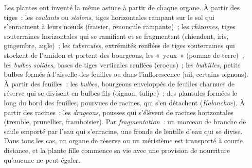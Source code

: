 \begin{proposition}\label{prop:b2:asexual-reproduction:organs}
Les plantes ont inventé la même astuce à partir de chaque organe. À
partir des tiges~: les \emph{coulants} ou \emph{stolons}, tiges
horizontales rampant sur le sol qui s'enracinent à leurs nœuds
(fraisier, renoncule rampante)~; les \emph{rhizomes}, tiges souterraines
horizontales qui se ramifient et se fragmentent (chiendent, iris,
gingembre,  aigle)~; les \emph{tubercules}, extrémités renflées de
tiges souterraines qui stockent de l'amidon et portent des bourgeons,
les «~yeux~» (pomme de terre)~; les \emph{bulbes solides}, bases de tiges
verticales renflées (crocus)~; les \emph{bulbilles}, petits bulbes
formés à l'aisselle des feuilles ou dans l'inflorescence (ail, certains
oignons). À partir des feuilles~: les \emph{bulbes}, bourgeons enveloppés
de feuilles charnues de réserve qui se divisent en bulbes fils (oignon,
tulipe)~; des plantules formées le long du bord des feuilles, pourvues
de racines, qui s'en détachent (\emph{Kalanchoe}). À partir des
racines~: les \emph{drageons}, pousses qui s'élèvent de racines
horizontales (tremble, prunellier, framboisier). Par
\emph{fragmentation}~: un morceau de branche de saule emporté par l'eau
qui s'enracine, une fronde de lentille d'eau qui se divise. Dans tous
les cas, un organe de réserve ou un méristème est transporté à courte
distance, et la plante fille commence sa vie avec une provision de
nourriture qu'aucune  ne peut égaler.
\end{proposition}

